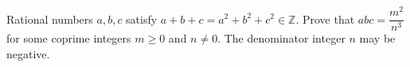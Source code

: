 Rational numbers $a,b,c$ satisfy $a+b+c=a^2+b^2+c^2\in\mathbb Z$. Prove that $abc=\dfrac{m^2}{n^3}$ for some coprime integers $m\ge0$ and $n\ne0$. The denominator integer $n$ may be negative.
